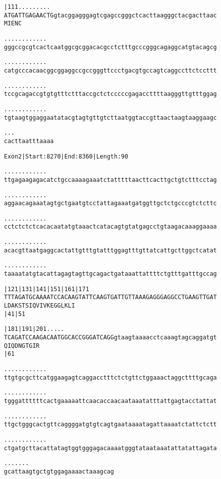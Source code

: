 \documentclass{article}
\begin{document}
\newpage
\begin{alltt}
        |111      .    .    .    .    .    .    .    .    . 
ATGATTGAGAACTGgtacggagggagtcgagccgggctcacttaagggctacgacttaac
M  I  E  N  C                                               

   .    .    .    .    .    .    .    .    .    .    .    . 
gggccgcgtcactcaatggcgcggacacgcctctttgcccgggcagaggcatgtacagcg

   .    .    .    .    .    .    .    .    .    .    .    . 
catgcccacaacggcggaggccgccgggttccctgacgtgccagtcaggccttctccttt

   .    .    .    .    .    .    .    .    .    .    .    . 
tccgcagaccgtgtgtttctttaccgctctcccccgagaccttttaagggttgtttggag

   .    .    .    .    .    .    .    .    .    .    .    . 
tgtaagtggaggaatatacgtagtgttgtcttaatggtaccgttaactaagtaaggaagc

   .    .    .
cacttaatttaaaa
\end{alltt}
\newpage
\begin{alltt}
Exon 2 | Start: 8270 | End: 8360 | Length: 90

.    .    .    .    .    .    .    .    .    .    .    .    
ttgagaagagacatctgccaaaagaaatctatttttaacttcacttgctgtctttcctag

.    .    .    .    .    .    .    .    .    .    .    .    
aggaacagaaatagtgctgaatgtcctattagaaatgatggttgctctgcccgtctcttc

.    .    .    .    .    .    .    .    .    .    .    .    
cctctctctcacacaatatgtaaactcatacagtgtatgagcctgtaagacaaaggaaaa

.    .    .    .    .    .    .    .    .    .    .    .    
acacgttaatgaggcactattgtttgtatttggagtttgttatcattgcttggctcatat

.    .    .    .    .    .    .    .    .    .    .    .    
taaaatatgtacattagagtagttgcagactgataaattattttctgtttgatttgccag

    |121      |131      |141      |151      |161      |171  
TTTAGATGCAAAATCCACAAGTATTCAAGTGATTGTTAAAGAGGGAGGCCTGAAGTTGAT
 L  D  A  K  S  T  S  I  Q  V  I  V  K  E  G  G  L  K  L  I 
    |41                           |51                       

    |181      |191      |201       .    .    .    .    .    
TCAGATCCAAGACAATGGCACCGGGATCAGGgtaagtaaaacctcaaagtagcaggatgt
 Q  I  Q  D  N  G  T  G  I  R                               
    |61                                                     

.    .    .    .    .    .    .    .    .    .    .    .    
ttgtgcgcttcatggaagagtcaggacctttctctgttctggaaactaggcttttgcaga

.    .    .    .    .    .    .    .    .    .    .    .    
tgggattttttcactgaaaaattcaacaccaacaataaatatttattgagtacctattat

.    .    .    .    .    .    .    .    .    .    .    .    
ttgctgggcactgttcaggggatgtgtcagtgaataaaatagattaaaatctattctctt

.    .    .    .    .    .    .    .    .    .    .    .    
ctgatgcttacattatagtggtgggagacaaaatgggtataataaatattatattagata

.    .    .    .    .    .    .
gcattaagtgctgtggagaaaactaaagcag
\end{alltt}
\end{document}
